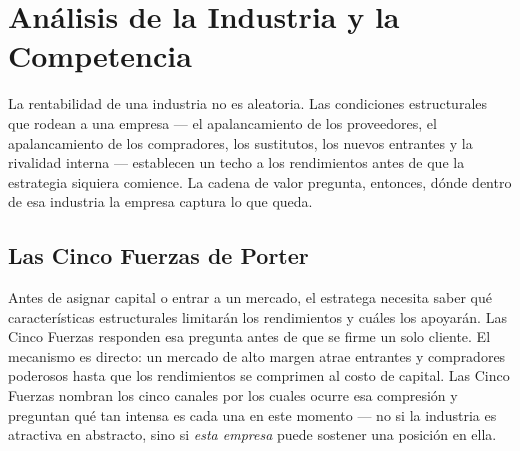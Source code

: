 \chapter{Análisis de la Industria y la Competencia}\label{ch:competitive-analysis}


La rentabilidad de una industria no es aleatoria. Las condiciones estructurales que rodean a
una empresa --- el apalancamiento de los proveedores, el apalancamiento de los compradores,
los sustitutos, los nuevos entrantes y la rivalidad interna --- establecen un techo a los
rendimientos antes de que la estrategia siquiera comience. La cadena de valor pregunta,
entonces, dónde dentro de esa industria la empresa captura lo que queda.

\section{Las Cinco Fuerzas de Porter}\label{sec:five-forces}

Antes de asignar capital o entrar a un mercado, el estratega necesita saber qué características
estructurales limitarán los rendimientos y cuáles los apoyarán. Las Cinco Fuerzas responden esa
pregunta antes de que se firme un solo cliente. El mecanismo es directo: un mercado de alto margen
atrae entrantes y compradores poderosos hasta que los rendimientos se comprimen al costo de capital.
Las Cinco Fuerzas nombran los cinco canales por los cuales ocurre esa compresión y preguntan qué
tan intensa es cada una en este momento --- no si la industria es atractiva en abstracto, sino si
\emph{esta empresa} puede sostener una posición en ella.


